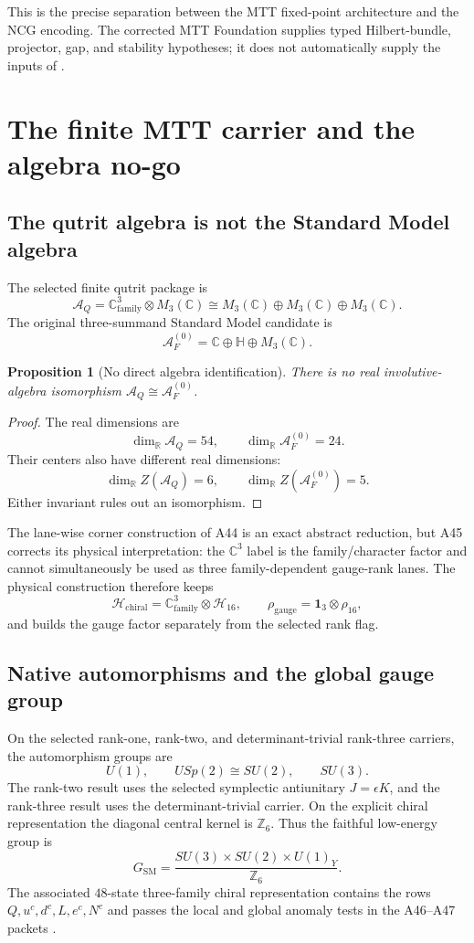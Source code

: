 \documentclass[11pt,a4paper,twoside]{article}
\theoremstyle{plain}
\newtheorem{proposition}[theorem]{Proposition}
\theoremstyle{definition}
\theoremstyle{remark}
\newcommand{\CC}{\mathbb{C}}
\newcommand{\RR}{\mathbb{R}}
\newcommand{\HH}{\mathbb{H}}
\newcommand{\AF}{\mathcal{A}_{F}}
\newcommand{\AQ}{\mathcal{A}_{Q}}
\newcommand{\id}{\mathbf{1}}
\begin{document}
This is the precise separation between the MTT fixed-point architecture and
the NCG encoding.  The corrected MTT Foundation supplies typed Hilbert-bundle,
projector, gap, and stability hypotheses; it does not automatically supply
the inputs of .

\section{The finite MTT carrier and the algebra no-go}

\subsection{The qutrit algebra is not the Standard Model algebra}

The selected finite qutrit package is
\[
 \AQ=\CC_{\mathrm{family}}^3\otimes M_3(\CC)
    \cong M_3(\CC)\oplus M_3(\CC)\oplus M_3(\CC).
\]
The original three-summand Standard Model candidate is
\[
 \AF^{(0)}=\CC\oplus\HH\oplus M_3(\CC).
\]

\begin{proposition}[No direct algebra identification]
\label{prop:no-direct}
There is no real involutive-algebra isomorphism
$\AQ\cong\AF^{(0)}$.
\end{proposition}

\begin{proof}
The real dimensions are
\[
 \dim_{\RR}\AQ=54,\qquad
 \dim_{\RR}\AF^{(0)}=24.
\]
Their centers also have different real dimensions:
\[
 \dim_{\RR}Z(\AQ)=6,\qquad
 \dim_{\RR}Z(\AF^{(0)})=5.
\]
Either invariant rules out an isomorphism.
\end{proof}

The lane-wise corner construction of A44 is an exact abstract reduction, but
A45 corrects its physical interpretation: the $\CC^3$ label is the
family/character factor and cannot simultaneously be used as three
family-dependent gauge-rank lanes.  The physical construction therefore
keeps
\[
 \mathcal{H}_{\mathrm{chiral}}
   =\CC^3_{\mathrm{family}}\otimes\mathcal{H}_{16},
 \qquad
 \rho_{\mathrm{gauge}}
   =\id_3\otimes\rho_{16},
\]
and builds the gauge factor separately from the selected rank flag.

\subsection{Native automorphisms and the global gauge group}

On the selected rank-one, rank-two, and determinant-trivial rank-three
carriers, the automorphism groups are
\[
 U(1),\qquad USp(2)\cong SU(2),\qquad SU(3).
\]
The rank-two result uses the selected symplectic antiunitary
$J=\epsilon K$, and the rank-three result uses the determinant-trivial
carrier.  On the explicit chiral representation the diagonal central kernel
is $\mathbb{Z}_6$.  Thus the faithful low-energy group is
\[
 G_{\mathrm{SM}}
   =\frac{SU(3)\times SU(2)\times U(1)_Y}{\mathbb{Z}_6}.
\]
The associated $48$-state three-family chiral representation contains the
rows $Q,u^c,d^c,L,e^c,N^c$ and passes the local and global anomaly tests in
the A46--A47 packets \cite{MTTResultsRepro2026}.
\end{document}
